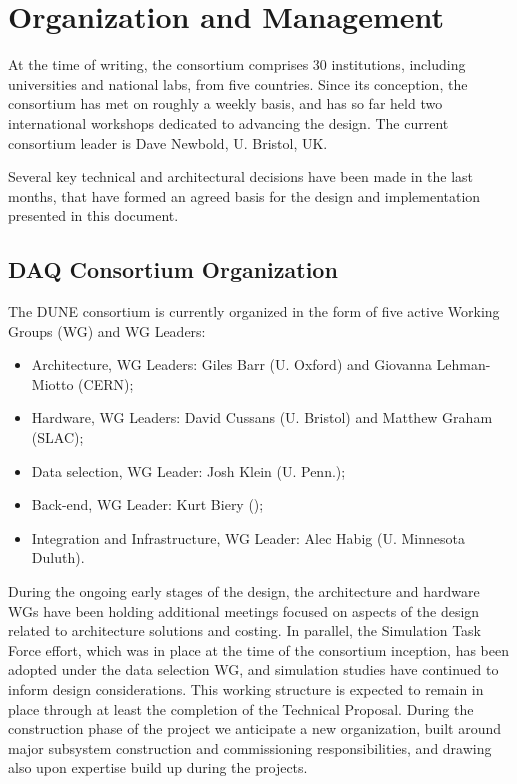 
\section{Organization and Management}
\label{sec:fd-daq-org}

At the time of writing, the  consortium comprises \num{30} institutions, including universities and national labs, from five countries. Since its conception, the  consortium has met on roughly a weekly basis, and has so far held two international workshops dedicated to advancing the    design. The current  consortium leader is Dave Newbold, U. Bristol, UK.

Several key technical and architectural decisions have been made in the last months, that have formed an agreed basis for the  design and implementation presented in this document.

\subsection{DAQ Consortium Organization}
\label{sec:fd-daq-org-consortium}

The DUNE  consortium is currently organized in the form of five active
Working Groups (WG) and WG Leaders:
\begin{itemize}
\item Architecture, WG Leaders: Giles Barr (U. Oxford) and Giovanna Lehman-Miotto (CERN);
\item Hardware, WG Leaders: David Cussans (U. Bristol) and Matthew Graham (SLAC);
\item Data selection, WG Leader: Josh Klein (U. Penn.);
\item Back-end, WG Leader: Kurt Biery (\fnal);
\item Integration and Infrastructure, WG Leader: Alec Habig
  (U. Minnesota Duluth).
\end{itemize}

During the ongoing early stages of the design, the architecture and hardware WGs have been holding additional meetings focused on aspects of the design related to architecture solutions and costing. In parallel, the  Simulation Task Force effort, which was in place at the time of the consortium inception, has been adopted under the data selection WG, and simulation studies have continued to inform design considerations. This working structure is expected to remain in place through at least the completion of the Technical Proposal. During the construction phase of the project we anticipate a new organization, built around major subsystem construction and commissioning responsibilities, and drawing also upon expertise build up during the  projects.

